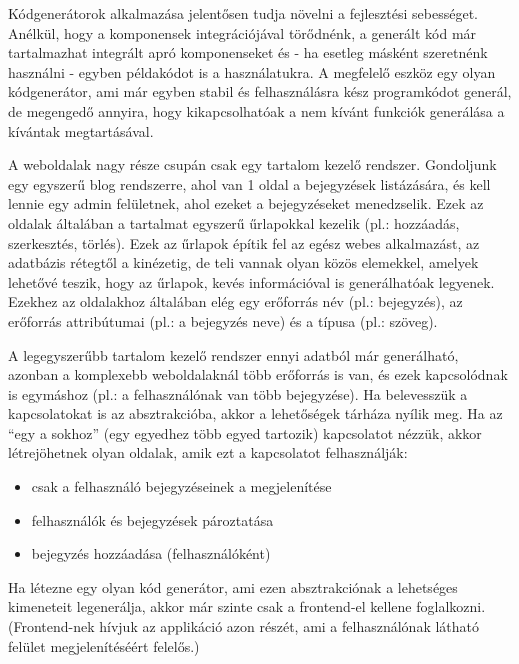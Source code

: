 \documentclass[a4paper,12pt,oneside]{report}
\begin{document}
\begin{justify}

	Kódgenerátorok alkalmazása jelentősen tudja növelni a fejlesztési sebességet. Anélkül, hogy a komponensek integrációjával törődnénk, a generált kód már tartalmazhat integrált apró komponenseket és - ha esetleg másként szeretnénk használni - egyben példakódot is a használatukra. A megfelelő eszköz egy olyan kódgenerátor, ami már egyben stabil és felhasználásra kész programkódot generál, de megengedő annyira, hogy kikapcsolhatóak a nem kívánt funkciók generálása a kívántak megtartásával.

    A weboldalak nagy része csupán csak egy tartalom kezelő rendszer. Gondoljunk egy egyszerű blog rendszerre, ahol van 1 oldal a bejegyzések listázására, és kell lennie egy admin felületnek, ahol ezeket a bejegyzéseket menedzselik. Ezek az oldalak általában a tartalmat egyszerű űrlapokkal kezelik (pl.: hozzáadás, szerkesztés, törlés). Ezek az űrlapok építik fel az egész webes alkalmazást, az adatbázis rétegtől a kinézetig, de teli vannak olyan közös elemekkel, amelyek lehetővé teszik, hogy az űrlapok, kevés információval is generálhatóak legyenek. Ezekhez az oldalakhoz általában elég egy erőforrás név (pl.: bejegyzés), az erőforrás attribútumai (pl.: a bejegyzés neve) és a típusa (pl.: szöveg). 
    
    \label{sec:abstraction_level}
	A legegyszerűbb tartalom kezelő rendszer ennyi adatból már generálható, azonban a komplexebb weboldalaknál több erőforrás is van, és ezek kapcsolódnak is egymáshoz (pl.: a felhasználónak van több bejegyzése). Ha belevesszük a kapcsolatokat is az absztrakcióba, akkor a lehetőségek tárháza nyílik meg. Ha az ``egy a sokhoz” (egy egyedhez több egyed tartozik) kapcsolatot nézzük, akkor létrejöhetnek olyan oldalak, amik ezt a kapcsolatot felhasználják:

	\begin{itemize}
		\item csak a felhasználó bejegyzéseinek a megjelenítése
		\item felhasználók és bejegyzések pároztatása
		\item bejegyzés hozzáadása (felhasználóként)
	\end{itemize}

	Ha létezne egy olyan kód generátor, ami ezen absztrakciónak a lehetséges kimeneteit legenerálja, akkor már szinte csak a frontend-el kellene foglalkozni. (Frontend-nek hívjuk az applikáció azon részét, ami a felhasználónak látható felület megjelenítéséért felelős.) 


\end{justify}
\end{document}
